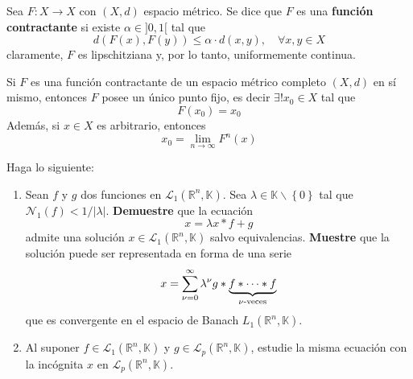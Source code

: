 \documentclass[12pt]{report}
\newcounter{it}
\theoremstyle{largebreak}
\newcommand\abs[1]{\ensuremath{\left|#1\right|}}
\newcommand\cf[3]{\ensuremath{#1:#2\rightarrow#3}}
\newcommand{\N}[2]{\ensuremath{\mathcal{N}_{#1}\left(#2\right)}}
\begin{document}
    \begin{mydef}
        Sea $\cf{F}{X}{X}$ con $(X,d)$ espacio métrico. Se dice que $F$ es una \textbf{función contractante} si existe $\alpha\in]0,1[$ tal que
        \begin{equation*}
            d(F(x),F(y))\leq \alpha\cdot d(x,y),\quad\forall x,y\in X
        \end{equation*}
        claramente, $F$ es lipschitziana y, por lo tanto, uniformemente continua.
    \end{mydef}

    \begin{theor}
        Si $F$ es una función contractante de un espacio métrico completo $(X,d)$ en sí mismo, entonces $F$ posee un único punto fijo, es decir $\exists! x_0\in X$ tal que
         \begin{equation*}
            F(x_0)=x_0
         \end{equation*}
         Además, si $x\in X$ es arbitrario, entonces
         \begin{equation*}
            x_0=\lim_{ n\rightarrow\infty}F^n(x)
         \end{equation*}
    \end{theor}

    \begin{excer}
        Haga lo siguiente:
        \begin{enumerate}
            \item Sean $f$ y $g$ dos funciones en $\mathcal{L}_1(\mathbb{R}^n,\mathbb{K})$. Sea $\lambda\in\mathbb{K}\backslash\left\{ 0\right\}$ tal que $\N{1}{f}<1/\abs{\lambda}$. \textbf{Demuestre} que la ecuación
            \begin{equation*}
                x=\lambda x*f+g
            \end{equation*}
            admite una solución $x\in\mathcal{L}_1(\mathbb{R}^n,\mathbb{K})$ salvo equivalencias. \textbf{Muestre} que la solución puede ser representada en forma de una serie
            \begin{equation*}
                x=\sum_{\nu=0}^\infty \lambda^\nu g*\underbrace{f*\cdots*f}_{\nu\textup{-veces}}
            \end{equation*}
            que es convergente en el espacio de Banach $L_1(\mathbb{R}^n,\mathbb{K})$.

            \item Al suponer $f\in\mathcal{L}_1(\mathbb{R}^n,\mathbb{K})$ y $g\in\mathcal{L}_p(\mathbb{R}^n,\mathbb{K})$, estudie la misma ecuación con la incógnita $x$ en $\mathcal{L}_p(\mathbb{R}^n,\mathbb{K})$.
        \end{enumerate}
    \end{excer}
\end{document}
